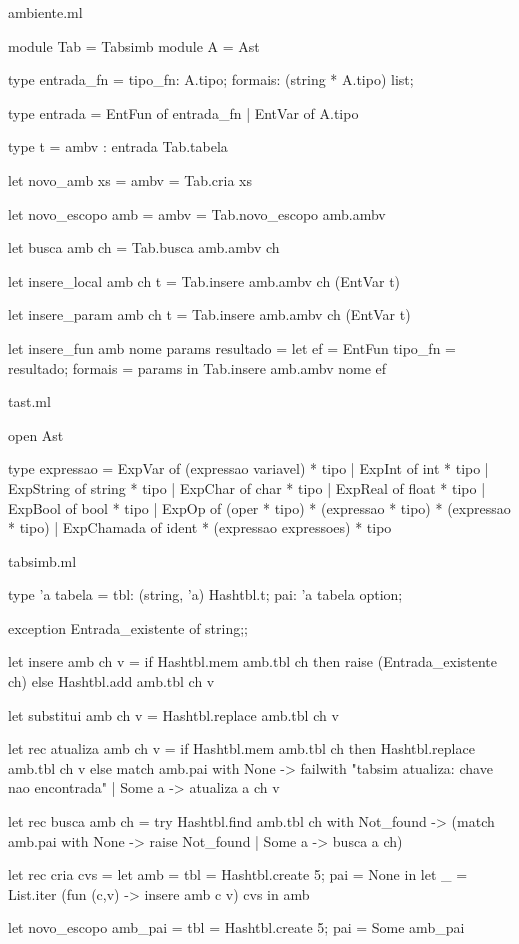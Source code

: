 \documentclass[12pt,a4paper,twoside]{article}
\begin{document}
ambiente.ml
\begin{terminal}
module Tab = Tabsimb
module A = Ast

type entrada_fn = { tipo_fn:  A.tipo;
                    formais: (string * A.tipo) list;
}

type entrada =  EntFun of entrada_fn
             |  EntVar of A.tipo

type t = {
  ambv : entrada Tab.tabela
}

let novo_amb xs = { ambv = Tab.cria xs }

let novo_escopo amb = { ambv = Tab.novo_escopo amb.ambv }

let busca amb ch = Tab.busca amb.ambv ch

let insere_local amb ch t =
  Tab.insere amb.ambv ch (EntVar t)

let insere_param amb ch t =
  Tab.insere amb.ambv ch (EntVar t)

let insere_fun amb nome params resultado =
  let ef = EntFun { tipo_fn = resultado;
                    formais = params }
  in Tab.insere amb.ambv nome ef
\end{terminal}
tast.ml
\begin{terminal}
open Ast

type expressao = ExpVar of (expressao variavel) * tipo
              | ExpInt of int * tipo
              | ExpString of string * tipo
              | ExpChar of char * tipo
              | ExpReal of float * tipo
              | ExpBool of bool * tipo
              | ExpOp of (oper * tipo) * (expressao * tipo) * (expressao * tipo)
              | ExpChamada of ident * (expressao expressoes) * tipo

\end{terminal}

tabsimb.ml
\begin{terminal}

type 'a tabela = {
    tbl: (string, 'a) Hashtbl.t;
    pai: 'a tabela option;
}

exception Entrada_existente of string;;

let insere amb ch v =
  if Hashtbl.mem amb.tbl ch
  then raise (Entrada_existente ch)
  else Hashtbl.add amb.tbl ch v

let substitui amb ch v = Hashtbl.replace amb.tbl ch v

let rec atualiza amb ch v =
    if Hashtbl.mem amb.tbl ch
    then Hashtbl.replace amb.tbl ch v
    else match amb.pai with
       None -> failwith "tabsim atualiza: chave nao encontrada"
     | Some a -> atualiza a ch v

let rec busca amb ch =
  try Hashtbl.find amb.tbl ch
  with Not_found ->
    (match amb.pai with
       None -> raise Not_found
     | Some a -> busca a ch)

let rec cria cvs =
  let amb = {
    tbl = Hashtbl.create 5;
    pai = None
  } in
  let _ = List.iter (fun (c,v) -> insere amb c v) cvs
  in amb

let novo_escopo amb_pai = {
  tbl = Hashtbl.create 5;
  pai = Some amb_pai
}
\end{terminal}
\end{document}
